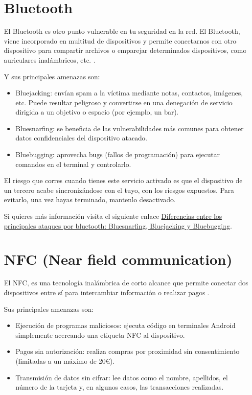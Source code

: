 \documentclass[
  spanish,
  a4paper,
  openany]{book}
\begin{document}
\hypertarget{bluetooth}{%
\section{Bluetooth}\label{bluetooth}}

El Bluetooth es otro punto vulnerable en tu seguridad en la red. El Bluetooth, viene incorporado en multitud de dispositivos y permite conectarnos con otro dispositivo para compartir archivos o emparejar determinados dispositivos, como auriculares inalámbricos, etc. \citep{IONOS-bluetooh}.

Y sus principales amenazas son:

\begin{itemize}
\item
  Bluejacking: envían spam a la víctima mediante notas, contactos, imágenes, etc. Puede resultar peligroso y convertirse en una denegación de servicio dirigida a un objetivo o espacio (por ejemplo, un bar).
\item
  Bluesnarfing: se beneficia de las vulnerabilidades más comunes para obtener datos confidenciales del dispositivo atacado.
\item
  Bluebugging: aprovecha bugs (fallos de programación) para ejecutar comandos en el terminal y controlarlo.
\end{itemize}

El riesgo que corres cuando tienes este servicio activado es que el dispositivo de un tercero acabe sincronizándose con el tuyo, con los riesgos expuestos. Para evitarlo, una vez hayas terminado, mantenlo desactivado.

Si quieres más información visita el siguiente enlace \href{https://computerhoy.com/noticias/tecnologia/diferencias-principales-ataques-bluetooth-bluesnarfing-bluejacking-bluebugging-1087867}{Diferencias entre los principales ataques por bluetooth: Bluesnarfing, Bluejacking y Bluebugging}.

\hypertarget{nfc-near-field-communication}{%
\section{NFC (Near field communication)}\label{nfc-near-field-communication}}

El NFC, es una tecnología inalámbrica de corto alcance que permite conectar dos dispositivos entre sí para intercambiar información o realizar pagos \citep{IONOS-nfc}.

Sus principales amenazas son:

\begin{itemize}
\item
  Ejecución de programas maliciosos: ejecuta código en terminales Android simplemente acercando una etiqueta NFC al dispositivo.
\item
  Pagos sin autorización: realiza compras por proximidad sin consentimiento (limitadas a un máximo de 20€).
\item
  Transmisión de datos sin cifrar: lee datos como el nombre, apellidos, el número de la tarjeta y, en algunos casos, las transacciones realizadas.
\end{itemize}
\end{document}
